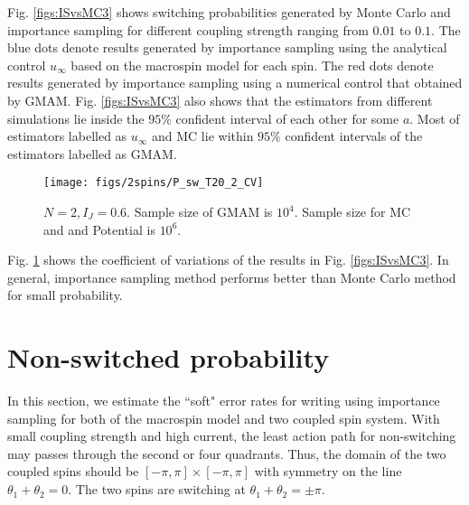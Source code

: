 \documentclass[journal,transmag]{IEEEtran}
\begin{document}
Fig. \ref{figs:ISvsMC3} shows switching probabilities generated by Monte Carlo and importance sampling for different coupling strength ranging from $0.01$ to $0.1$. The blue dots denote results generated by importance sampling using the analytical control $u_{\infty}$  based on the macrospin model for each spin. The red dots denote results generated by importance sampling using a numerical control that obtained by GMAM. 
 Fig. \ref{figs:ISvsMC3} also shows that the estimators from different simulations lie inside the $95\%$ confident interval of each other for some $a$. Most of estimators labelled as $u_\infty$ and MC lie within  $95\%$ confident intervals of the estimators labelled as GMAM.

 \begin{figure}[h]
   \centering
         \texttt{[image: figs/2spins/P\_sw\_T20\_2\_CV]}
   \caption{$N = 2, I_J = 0.6$. Sample size of GMAM is $10^4$. Sample size for MC and and Potential  is $10^6$. }
      \label{figs:ISvsMC3_cv}
\end{figure}

Fig. \ref{figs:ISvsMC3_cv} shows the  coefficient of variations of the results in Fig. \ref{figs:ISvsMC3}. In general, importance sampling method performs better than Monte Carlo method for small probability. 

\section{Non-switched probability}
In this section, we estimate the ``soft" error rates for writing using importance sampling for both of the macrospin model and two coupled spin system. With small coupling strength and high current, the least action path for non-switching may passes through the second or four quadrants. Thus, the domain of the two coupled spins should be $[-\pi,\pi] \times  [-\pi,\pi ]$ with symmetry on the line $ \theta_1 + \theta_2 = 0$. The two spins are switching at $ \theta_1 + \theta_2 = \pm \pi.$
\end{document}
